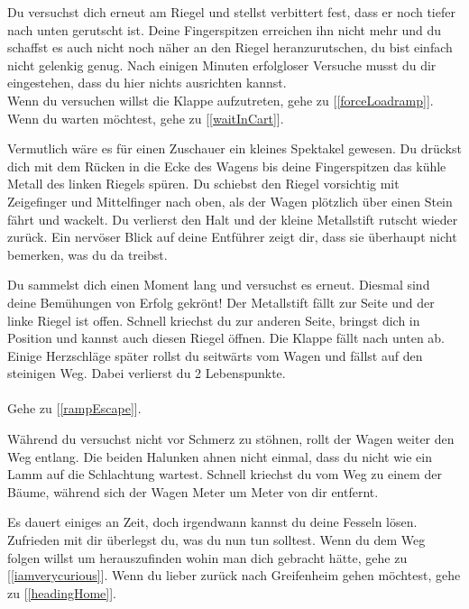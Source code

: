 Du versuchst dich erneut am Riegel und stellst verbittert fest, dass er noch tiefer nach unten gerutscht ist. Deine Fingerspitzen erreichen ihn nicht mehr und du schaffst es auch nicht noch näher an den Riegel heranzurutschen, du bist einfach nicht gelenkig genug. Nach einigen Minuten erfolgloser Versuche musst du dir eingestehen, dass du hier nichts ausrichten kannst.
\\Wenn du versuchen willst die Klappe aufzutreten, gehe zu [\ref{forceLoadramp}].
\\Wenn du warten möchtest, gehe zu [\ref{waitInCart}].


Vermutlich wäre es für einen Zuschauer ein kleines Spektakel gewesen. Du drückst dich mit dem Rücken in die Ecke des Wagens bis deine Fingerspitzen das kühle Metall des linken Riegels spüren. Du schiebst den Riegel vorsichtig mit Zeigefinger und Mittelfinger nach oben, als der Wagen plötzlich über einen Stein fährt und wackelt. Du verlierst den Halt und der kleine Metallstift rutscht wieder zurück. Ein nervöser Blick auf deine Entführer zeigt dir, dass sie überhaupt nicht bemerken, was du da treibst.

Du sammelst dich einen Moment lang und versuchst es erneut. Diesmal sind deine Bemühungen von Erfolg gekrönt! Der Metallstift fällt zur Seite und der linke Riegel ist offen. Schnell kriechst du zur anderen Seite, bringst dich in Position und kannst auch diesen Riegel öffnen. Die Klappe fällt nach unten ab. Einige Herzschläge später rollst du seitwärts vom Wagen und fällst auf den steinigen Weg. Dabei verlierst du 2 Lebenspunkte.\\
\\Gehe zu [\ref{rampEscape}].


Während du versuchst nicht vor Schmerz zu stöhnen, rollt der Wagen weiter den Weg entlang. Die beiden Halunken ahnen nicht einmal, dass du nicht wie ein Lamm auf die Schlachtung wartest. Schnell kriechst du vom Weg zu einem der Bäume, während sich der Wagen Meter um Meter von dir entfernt.

Es dauert einiges an Zeit, doch irgendwann kannst du deine Fesseln lösen. Zufrieden mit dir überlegst du, was du nun tun solltest. Wenn du dem Weg folgen willst um herauszufinden wohin man dich gebracht hätte, gehe zu [\ref{iamverycurious}]. Wenn du lieber zurück nach Greifenheim gehen möchtest, gehe zu [\ref{headingHome}].

